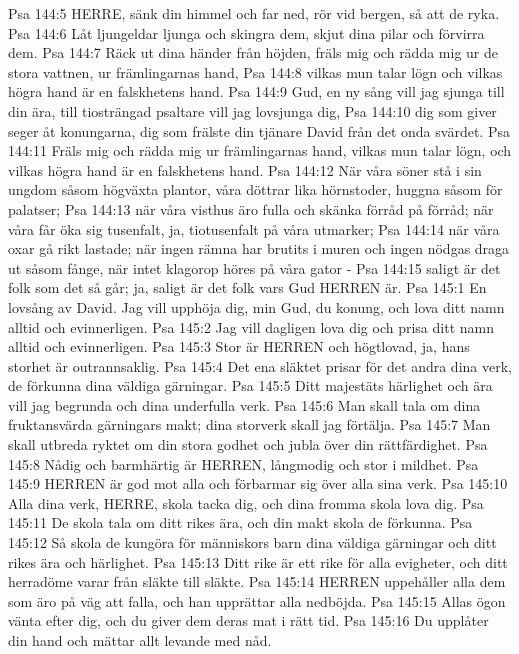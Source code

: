 Psa 144:5  HERRE, sänk din himmel och far ned, rör vid bergen, så att de ryka.
Psa 144:6  Låt ljungeldar ljunga och skingra dem, skjut dina pilar och förvirra dem.
Psa 144:7  Räck ut dina händer från höjden, fräls mig och rädda mig ur de stora vattnen, ur främlingarnas hand,
Psa 144:8  vilkas mun talar lögn och vilkas högra hand är en falskhetens hand.
Psa 144:9  Gud, en ny sång vill jag sjunga till din ära, till tiosträngad psaltare vill jag lovsjunga dig,
Psa 144:10  dig som giver seger åt konungarna, dig som frälste din tjänare David från det onda svärdet.
Psa 144:11  Fräls mig och rädda mig ur främlingarnas hand, vilkas mun talar lögn, och vilkas högra hand är en falskhetens hand.
Psa 144:12  När våra söner stå i sin ungdom såsom högväxta plantor, våra döttrar lika hörnstoder, huggna såsom för palatser;
Psa 144:13  när våra visthus äro fulla och skänka förråd på förråd; när våra får öka sig tusenfalt, ja, tiotusenfalt på våra utmarker;
Psa 144:14  när våra oxar gå rikt lastade; när ingen rämna har brutits i muren och ingen nödgas draga ut såsom fånge, när intet klagorop höres på våra gator -
Psa 144:15  saligt är det folk som det så går; ja, saligt är det folk vars Gud HERREN är.
Psa 145:1  En lovsång av David. Jag vill upphöja dig, min Gud, du konung, och lova ditt namn alltid och evinnerligen.
Psa 145:2  Jag vill dagligen lova dig och prisa ditt namn alltid och evinnerligen.
Psa 145:3  Stor är HERREN och högtlovad, ja, hans storhet är outrannsaklig.
Psa 145:4  Det ena släktet prisar för det andra dina verk, de förkunna dina väldiga gärningar.
Psa 145:5  Ditt majestäts härlighet och ära vill jag begrunda och dina underfulla verk.
Psa 145:6  Man skall tala om dina fruktansvärda gärningars makt; dina storverk skall jag förtälja.
Psa 145:7  Man skall utbreda ryktet om din stora godhet och jubla över din rättfärdighet.
Psa 145:8  Nådig och barmhärtig är HERREN, långmodig och stor i mildhet.
Psa 145:9  HERREN är god mot alla och förbarmar sig över alla sina verk.
Psa 145:10  Alla dina verk, HERRE, skola tacka dig, och dina fromma skola lova dig.
Psa 145:11  De skola tala om ditt rikes ära, och din makt skola de förkunna.
Psa 145:12  Så skola de kungöra för människors barn dina väldiga gärningar och ditt rikes ära och härlighet.
Psa 145:13  Ditt rike är ett rike för alla evigheter, och ditt herradöme varar från släkte till släkte.
Psa 145:14  HERREN uppehåller alla dem som äro på väg att falla, och han upprättar alla nedböjda.
Psa 145:15  Allas ögon vänta efter dig, och du giver dem deras mat i rätt tid.
Psa 145:16  Du upplåter din hand och mättar allt levande med nåd.

